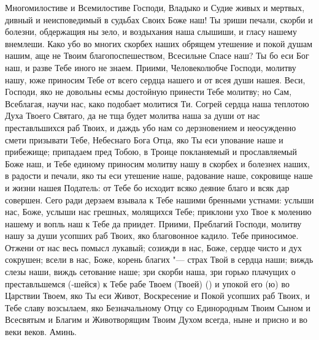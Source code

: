 \begin{mymulticols}
 

\vspace{-\baselineskip}

Многомилостиве и Всемилостиве Господи, Владыко и Судие живых и мертвых, дивный и неисповедимый в судьбах Своих Боже наш! Ты зриши печали, скорби и болезни, обдержащия ны зело, и воздыхания наша слышиши, и гласу нашему внемлеши. Како убо во многих скорбех наших обрящем утешение и покой душам нашим, аще не Твоим благопоспешеством, Всесильне Спасе наш? Ты бо еси Бог наш, и разве Тебе иного не знаем. Приими, Человеколюбче Господи, молитву нашу, юже приносим Тебе от всего сердца нашего и от всея души нашея. Веси, Господи, яко не довольны есмы достойную принести Тебе молитву; но Сам, Всеблагая, научи нас, како подобает молитися Ти. Согрей сердца наша теплотою Духа Твоего Святаго, да не тща будет молитва наша за души от нас преставльшихся раб Твоих, и даждь убо нам со дерзновением и неосужденно смети призывати Тебе, Небеснаго Бога Отца, яко Ты еси упование наше и прибежище; припадаем пред Тобою, в Троице покланяемый и прославляемый Боже наш, и Тебе единому приносим молитву нашу в скорбех и болезнех наших, в радости и печали, яко ты еси утешение наше, радование наше, сокровище наше и жизни нашея Податель: от Тебе бо исходит всяко деяние благо и всяк дар совершен. Сего ради дерзаем взывала к Тебе нашими бренными устнами: услыши нас, Боже, услыши нас грешных, молящихся Тебе; приклони ухо Твое к молению нашему и вопль наш к Тебе да приидет. Приими, Преблагий Господи, молитву нашу за души усопших раб Твоих, яко благовонное кадило. Тебе приносимое. Отжени от нас весь помысл лукавый; созижди в нас, Боже, сердце чисто и дух сокрушен; всели в нас, Боже, корень благих "--- страх Твой в сердца наши; виждь слезы наши, виждь сетование наше; зри скорби наша, зри горько плачущих о преставльшемся (-шейся) к Тебе рабе Твоем (Твоей) () и упокой его (ю) во Царствии Твоем, яко Ты еси Живот, Воскресение и Покой усопших раб Твоих, и Тебе славу возсылаем, яко Безначальному Отцу со Единородным Твоим Сыном и Всесвятым и Благим и Животворящим Твоим Духом всегда, ныне и присно и во веки веков. Аминь. 

\end{mymulticols}

\mychapterending


